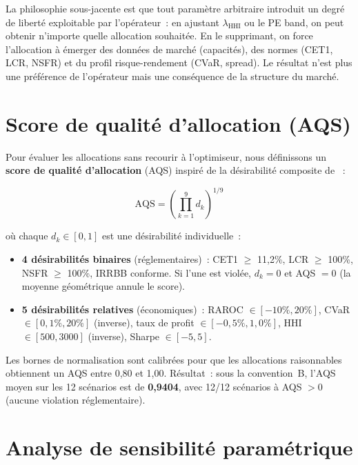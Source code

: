 \documentclass[12pt, a4paper, twoside, openright]{report}
\theoremstyle{definition}
\begin{document}
La philosophie sous-jacente est que tout paramètre arbitraire introduit un degré de liberté exploitable par l'opérateur~: en ajustant $\lambda_{\text{HHI}}$ ou le PE band, on peut obtenir n'importe quelle allocation souhaitée. En le supprimant, on force l'allocation à émerger des données de marché (capacités), des normes (CET1, LCR, NSFR) et du profil risque-rendement (CVaR, spread). Le résultat n'est plus une préférence de l'opérateur mais une conséquence de la structure du marché.


\section{Score de qualité d'allocation (AQS)}
\label{sec:aqs}

Pour évaluer les allocations sans recourir à l'optimiseur, nous définissons un \textbf{score de qualité d'allocation} (AQS) inspiré de la désirabilité composite de \citet{derringer1980}~:

\begin{equation}
\text{AQS} = \left(\prod_{k=1}^{9} d_k\right)^{1/9}
\label{eq:aqs}
\end{equation}

\noindent où chaque $d_k \in [0, 1]$ est une désirabilité individuelle~:

\begin{itemize}
\item \textbf{4 désirabilités binaires} (réglementaires)~: CET1 $\geq$ 11,2\%, LCR $\geq$ 100\%, NSFR $\geq$ 100\%, IRRBB conforme. Si l'une est violée, $d_k = 0$ et AQS $= 0$ (la moyenne géométrique annule le score).
\item \textbf{5 désirabilités relatives} (économiques)~: RAROC $\in [-10\%, 20\%]$, CVaR $\in [0{,}1\%, 20\%]$ (inverse), taux de profit $\in [-0{,}5\%, 1{,}0\%]$, HHI $\in [500, 3000]$ (inverse), Sharpe $\in [-5, 5]$.
\end{itemize}

Les bornes de normalisation sont calibrées pour que les allocations raisonnables obtiennent un AQS entre 0,80 et 1,00. Résultat~: sous la convention~B, l'AQS moyen sur les 12 scénarios est de \textbf{0,9404}, avec 12/12 scénarios à AQS $> 0$ (aucune violation réglementaire).


\section{Analyse de sensibilité paramétrique}
\label{sec:param-sensitivity}
\end{document}
